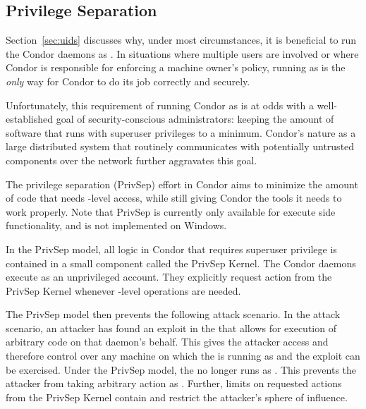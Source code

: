 \subsection{\label{sec:PrivSep}Privilege Separation}

Section~\ref{sec:uids} discusses why, under most circumstances, it is
beneficial to run the Condor daemons as . In situations
where multiple users are involved or where Condor is responsible for
enforcing a machine owner's policy, running as  is the 
\emph{only} way for Condor to do its job correctly and securely.

Unfortunately, this requirement of running Condor as  is
at odds with a well-established goal of security-conscious
administrators: keeping the amount of software that runs with
superuser privileges to a minimum. Condor's nature as a
large distributed system that routinely communicates with potentially
untrusted components over the network further aggravates this goal.

The privilege separation (PrivSep) effort in Condor aims to minimize
the amount of code that needs -level access, while still
giving Condor the tools it needs to work properly. Note that PrivSep
is currently only available for execute side functionality, and is not
implemented on Windows.

In the PrivSep model, all logic in Condor that requires superuser
privilege is contained in a small component called 
the PrivSep Kernel.
The Condor daemons execute as an unprivileged account.
They explicitly request action from the PrivSep Kernel whenever
-level operations are needed.

The PrivSep model then prevents the following attack scenario.
In the attack scenario, an attacker has found an exploit in the
 that allows for execution of arbitrary code on that
daemon's behalf. 
This gives the attacker  access and therefore
control over any machine
on which the  is running as 
and the exploit can be exercised.
Under the PrivSep model,
the  no longer runs as .
This prevents the attacker from taking arbitrary action as . 
Further, limits on requested actions from the PrivSep Kernel
contain and restrict the attacker's sphere of influence.

